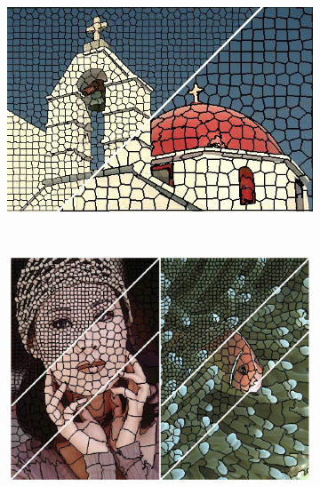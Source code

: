 

\begin{figure}[htbp]
	\centering
    \begin{subfigure}[l]{0.51\textwidth}
        \centering
    	\includegraphics[width=\textwidth]
    	{figures/Superpixels-02.jpg}
        \end{subfigure}
        ~
        \begin{subfigure}[r]{0.47\textwidth}
	        \centering
    		\includegraphics[width=\textwidth]
    		{figures/Superpixels-03.png}
		\end{subfigure} 
    \caption{}
    \label{fig:generic_garment_segmentation}
\end{figure}

